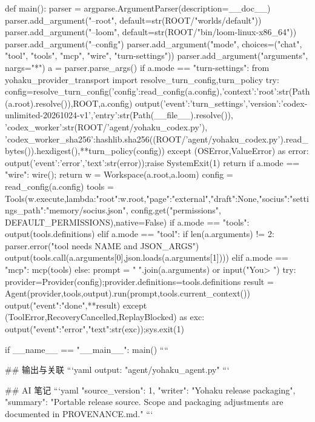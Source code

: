 def main():
    parser = argparse.ArgumentParser(description=__doc__)
    parser.add_argument("--root", default=str(ROOT/"worlds/default"))
    parser.add_argument("--loom", default=str(ROOT/"bin/loom-linux-x86_64"))
    parser.add_argument("--config")
    parser.add_argument("mode", choices=("chat", "tool", "tools", "mcp", "wire", "turn-settings"))
    parser.add_argument("arguments", nargs="*")
    a = parser.parse_args()
    if a.mode == "turn-settings":
        from yohaku_provider_transport import resolve_turn_config,turn_policy
        try:
            config=resolve_turn_config({'config':read_config(a.config),'context':{'root':str(Path(a.root).resolve())}},ROOT,a.config)
            output({'event':'turn_settings','version':'codex-unlimited-20261024-v1','entry':str(Path(__file__).resolve()),
                    'codex_worker':str(ROOT/'agent/yohaku_codex.py'),
                    'codex_worker_sha256':hashlib.sha256((ROOT/'agent/yohaku_codex.py').read_bytes()).hexdigest(),**turn_policy(config)})
        except (OSError,ValueError) as error:
            output({'event':'error','text':str(error)});raise SystemExit(1)
        return
    if a.mode == "wire": wire(); return
    w = Workspace(a.root,a.loom)
    config = read_config(a.config)
    tools = Tools(w.execute,lambda:{"root":w.root,"page":"external","draft":None,"socius":{"settings_path":"memory/socius.json"}}, config.get("permissions", DEFAULT_PERMISSIONS),native=False)
    if a.mode == "tools": output(tools.definitions)
    elif a.mode == "tool":
        if len(a.arguments) != 2: parser.error("tool needs NAME and JSON_ARGS")
        output(tools.call(a.arguments[0],json.loads(a.arguments[1])))
    elif a.mode == "mcp": mcp(tools)
    else:
        prompt = " ".join(a.arguments) or input("You> ")
        try:
            provider=Provider(config);provider.definitions=tools.definitions
            result = Agent(provider,tools,output).run(prompt,tools.current_context())
            output({"event":"done",**result})
        except (ToolError,RecoveryCancelled,ReplayBlocked) as exc: output({"event":"error","text":str(exc)});sys.exit(1)

if __name__ == "__main__": main()
````

## 输出与关联
```yaml
output: "agent/yohaku_agent.py"
```

## AI 笔记
```yaml
{"source_version": 1, "writer": "Yohaku release packaging", "summary": "Portable release source. Scope and packaging adjustments are documented in PROVENANCE.md."}
```

